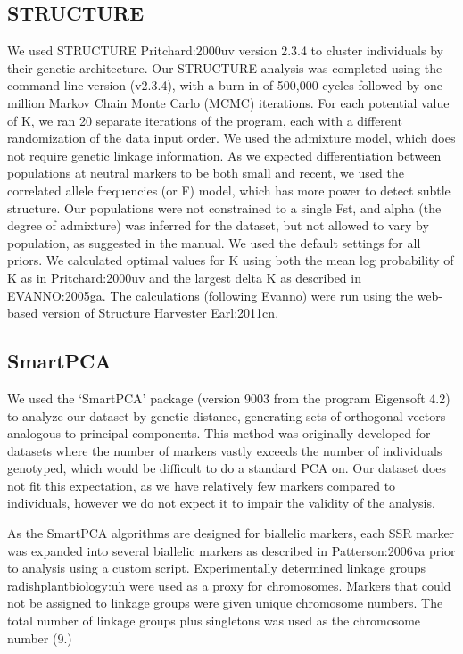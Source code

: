 \documentclass[twocolumn]{bmcart}%
\begin{document}
\subsection*{STRUCTURE}

We used STRUCTURE {Pritchard:2000uv} version 2.3.4 to cluster individuals by their genetic architecture. Our STRUCTURE analysis was completed using the command line version (v2.3.4), with a burn in of 500,000 cycles followed by one million Markov Chain Monte Carlo (MCMC) iterations. For each potential value of K, we ran 20 separate iterations of the program, each with a different randomization of the data input order. We used the admixture model, which does not require genetic linkage information. As we expected differentiation between populations at neutral markers to be both small and recent, we used the correlated allele frequencies (or F) model, which has more power to detect subtle structure. Our populations were not constrained to a single Fst, and alpha (the degree of admixture) was inferred for the dataset, but not allowed to vary by population, as suggested in the manual. We used the default settings for all priors. We calculated optimal values for K using both the mean log probability of K as in {Pritchard:2000uv} and the largest delta K as described in {EVANNO:2005ga}. The calculations (following Evanno) were run using the web-based version of Structure Harvester {Earl:2011cn}.
%
%
%

\subsection*{SmartPCA}

We used the ‘SmartPCA’ package (version 9003 from the program Eigensoft 4.2) to analyze our dataset by genetic distance, generating sets of orthogonal vectors analogous to principal components. This method was originally developed for datasets where the number of markers vastly exceeds the number of individuals genotyped, which would be difficult to do a standard PCA on. Our dataset does not fit this expectation, as we have relatively few markers compared to individuals, however we do not expect it to impair the validity of the analysis.

As the SmartPCA algorithms are designed for biallelic markers, each SSR marker was expanded into several biallelic markers as described in {Patterson:2006va} prior to analysis using a custom script. Experimentally determined linkage groups {radishplantbiology:uh} were used as a proxy for chromosomes. Markers that could not be assigned to linkage groups were given unique chromosome numbers. The total number of linkage groups plus singletons was used as the chromosome number (9.)
\end{document}
